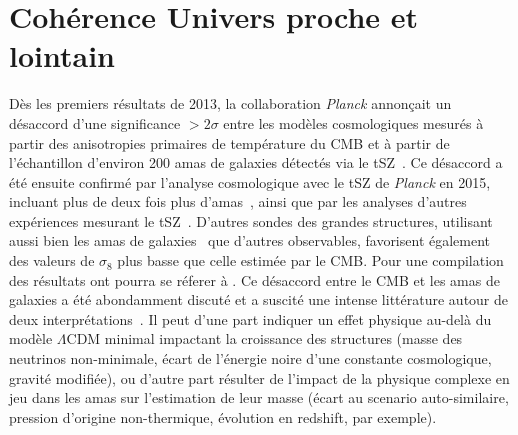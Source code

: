 \section{Cohérence Univers proche et lointain}
\label{se:cosmo_tensions}

Dès les premiers résultats de 2013, la
collaboration \emph{Planck} annonçait un désaccord
d'une significance $>2\sigma$ entre les modèles cosmologiques mesurés
à partir des anisotropies primaires de température du CMB et à partir de
l'échantillon d'environ 200 amas de galaxies détectés via le
tSZ~\citep{Planck_2014_SZ_Cosmo, Planck_2014_ymap}. Ce désaccord a été
ensuite confirmé par l'analyse cosmologique avec le tSZ
de \emph{Planck} en 2015, incluant plus de deux fois plus
d'amas~\citep{Planck_2016_SZ_cosmo, Planck2016_ymap}, ainsi que par
les analyses d'autres expériences mesurant le
tSZ~\citep[\emph{e.g.}][]{Hasselfield2013_ACT_SZ,
deHaan2016}. D'autres sondes des grandes structures, utilisant aussi
bien les amas de galaxies~\citep[\emph{e.g.}][]{Bohringer2014,
Pacaud2018} que d'autres observables, favorisent également des valeurs
de $\sigma_8$ plus basse que celle estimée par le CMB. Pour une
compilation des résultats ont pourra se réferer à \citet{Salvati2018}.
Ce désaccord entre le CMB et les amas de galaxies a été
abondamment discuté et a suscité une intense littérature autour de
deux interprétations~\citep[voir \emph{e.g.}][pour un
résumé]{Planck_2016_SZ_cosmo, Salvati2018}. Il peut d'une part
indiquer un effet physique au-delà du modèle $\Lambda$CDM minimal
impactant la croissance des structures (masse des neutrinos
non-minimale, écart de l'énergie noire d'une constante cosmologique,
gravité modifiée), ou d'autre part résulter de l'impact de la
physique complexe en jeu dans les amas sur l'estimation de leur masse
(écart au scenario auto-similaire, pression d'origine non-thermique,
évolution en redshift, par exemple).    

